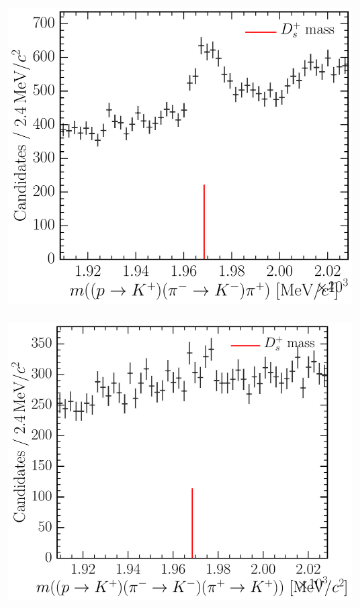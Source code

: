 \begin{figure}
\begin{subfigure}[b]{0.3\textwidth}
    \caption{\decay{\PDplus}{\Ppiplus\Ppiminus\Ppiplus}}
    \label{fig:cpv:selection:background_study:ppipi_meson:pipipi}
  \end{subfigure}
  \begin{subfigure}[b]{0.3\textwidth}
    \includegraphics[width=\textwidth]{figures/cpv/selection/background_study/ppipi/LcToppipi_2012_MagDown_Ds_ppTokp_pimTokm_pip}
    \caption{\decay{\PDsplus}{\PKplus\PKminus\Ppiplus}}
    \label{fig:cpv:selection:background_study:ppipi_meson:kkpi}
  \end{subfigure}
  \begin{subfigure}[b]{0.3\textwidth}
    \includegraphics[width=\textwidth]{figures/cpv/selection/background_study/ppipi/LcToppipi_2012_MagDown_Ds_ppTokp_pimTokm_pipTokp}

\end{subfigure}
\end{figure}
